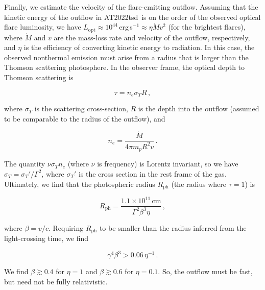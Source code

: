 \documentclass{nature_plusfigure}
\newcommand{\at}{AT2022tsd}
\begin{document}
\begin{methods}
Finally, we estimate the velocity of the flare-emitting outflow. Assuming that the kinetic energy of the outflow in \at\ is on the order of the observed optical flare luminosity, we have $L_\mathrm{opt} \approx 10^{44}\,$erg\,s$^{-1} \approx \eta \dot{M}v^2$ (for the brightest flares), where $\dot{M}$ and $v$ are the mass-loss rate and velocity of the outflow, respectively, and $\eta$ is the efficiency of converting kinetic energy to radiation. In this case, the observed nonthermal emission must arise from a radius that is larger than the Thomson scattering photosphere. In the observer frame, the optical depth to Thomson scattering is

\begin{equation}
\tau = n_e \sigma_T R\, ,
\end{equation}

\noindent where $\sigma_T$ is the scattering cross-section, $R$ is the depth into the outflow (assumed to be comparable to the radius of the outflow), and

\begin{equation}
    n_e = \frac{\dot{M}}{4\pi m_p R^2 v}\, .
\end{equation}

\noindent The quantity $\nu \sigma_T n_e$ (where $\nu$ is frequency) is Lorentz invariant\cite{Rybicki1986}, so we have $\sigma_T = \sigma_T' / \Gamma^2$, where $\sigma_T'$ is the cross section in the rest frame of the gas. Ultimately, we find that the photospheric radius $R_\mathrm{ph}$ (the radius where $\tau=1$) is

\begin{equation}
    R_\mathrm{ph} = \frac{1.1 \times 10^{11}\,\mathrm{cm}}{ \Gamma^2 \beta^3 \eta}\, ,
\end{equation}

\noindent where $\beta=v/c$. Requiring $R_\mathrm{ph}$ to be smaller than the radius inferred from the light-crossing time, we find

\begin{equation}
    \gamma^4 \beta^3 > 0.06\, \eta^{-1}\, .
\end{equation}

\noindent We find $\beta \gtrsim 0.4$ for $\eta=1$ and $\beta \gtrsim 0.6$ for $\eta=0.1$. So, the outflow must be fast, but need not be fully relativistic.


\end{methods}
\end{document}

